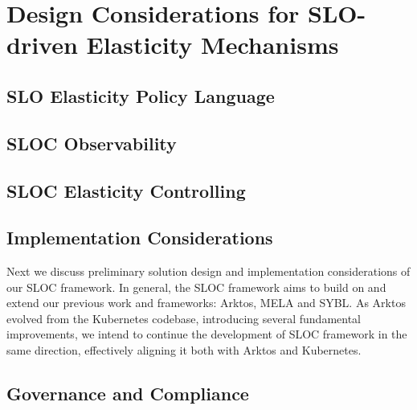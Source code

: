 \section{Design Considerations for SLO-driven Elasticity Mechanisms}
\label{sec:mechanisms}

\subsection{SLO Elasticity Policy Language}

\subsection{SLOC Observability}

\subsection{SLOC Elasticity Controlling}

\subsection{Implementation Considerations}
Next we discuss preliminary solution
design and implementation considerations of our SLOC framework.
In general, the SLOC framework aims to build on and extend our previous
work and frameworks: Arktos, MELA and SYBL.
%
As Arktos evolved from the Kubernetes codebase, introducing several fundamental 
improvements, we intend to continue the development of SLOC framework
in the same direction, effectively aligning it both with Arktos and Kubernetes.



\subsection{Governance and Compliance}
